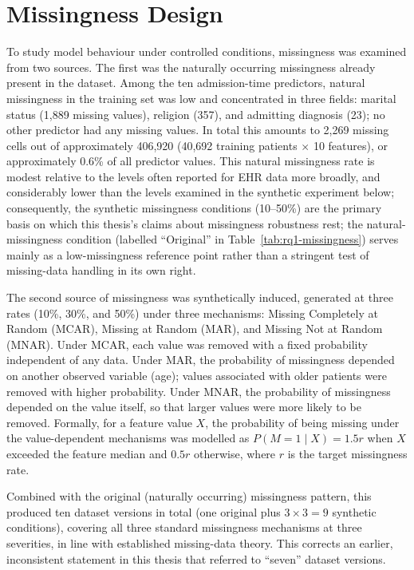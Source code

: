 \documentclass[12pt,a4paper]{report}
\begin{document}
\section{Missingness Design}
To study model behaviour under controlled conditions, missingness was examined from two sources. The first was the naturally occurring missingness already present in the dataset. Among the ten admission-time predictors, natural missingness in the training set was low and concentrated in three fields: marital status (1,889 missing values), religion (357), and admitting diagnosis (23); no other predictor had any missing values. In total this amounts to 2,269 missing cells out of approximately 406,920 (40,692 training patients $\times$ 10 features), or approximately 0.6\% of all predictor values. This natural missingness rate is modest relative to the levels often reported for EHR data more broadly, and considerably lower than the levels examined in the synthetic experiment below; consequently, the synthetic missingness conditions (10--50\%) are the primary basis on which this thesis's claims about missingness robustness rest; the natural-missingness condition (labelled ``Original'' in Table~\ref{tab:rq1-missingness}) serves mainly as a low-missingness reference point rather than a stringent test of missing-data handling in its own right.

The second source of missingness was synthetically induced, generated at three rates (10\%, 30\%, and 50\%) under three mechanisms: Missing Completely at Random (MCAR), Missing at Random (MAR), and Missing Not at Random (MNAR). Under MCAR, each value was removed with a fixed probability independent of any data. Under MAR, the probability of missingness depended on another observed variable (age); values associated with older patients were removed with higher probability. Under MNAR, the probability of missingness depended on the value itself, so that larger values were more likely to be removed. Formally, for a feature value $X$, the probability of being missing under the value-dependent mechanisms was modelled as $P(M=1 \mid X) = 1.5r$ when $X$ exceeded the feature median and $0.5r$ otherwise, where $r$ is the target missingness rate.

Combined with the original (naturally occurring) missingness pattern, this produced ten dataset versions in total (one original plus $3\times3 = 9$ synthetic conditions), covering all three standard missingness mechanisms at three severities, in line with established missing-data theory. This corrects an earlier, inconsistent statement in this thesis that referred to ``seven'' dataset versions.
\end{document}
